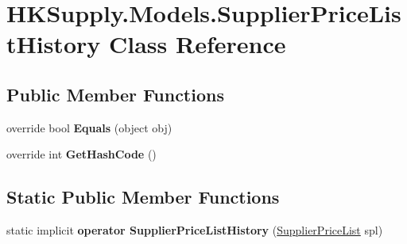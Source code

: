 \hypertarget{class_h_k_supply_1_1_models_1_1_supplier_price_list_history}{}\section{H\+K\+Supply.\+Models.\+Supplier\+Price\+List\+History Class Reference}
\label{class_h_k_supply_1_1_models_1_1_supplier_price_list_history}
\subsection*{Public Member Functions}
\begin{DoxyCompactItemize}
\item 
\mbox{\label{class_h_k_supply_1_1_models_1_1_supplier_price_list_history_ac92906c26dbc84673e3392821f1f87d0}} 
override bool {\bfseries Equals} (object obj)
\item 
\mbox{\label{class_h_k_supply_1_1_models_1_1_supplier_price_list_history_aab41e6bca3f34041ab970b25a9ece358}} 
override int {\bfseries Get\+Hash\+Code} ()
\end{DoxyCompactItemize}
\subsection*{Static Public Member Functions}
\begin{DoxyCompactItemize}
\item 
\mbox{\label{class_h_k_supply_1_1_models_1_1_supplier_price_list_history_a4f9d8a121a77818c187b7837fdba7dd9}} 
static implicit {\bfseries operator Supplier\+Price\+List\+History} (\mbox{\hyperlink{class_h_k_supply_1_1_models_1_1_supplier_price_list}{Supplier\+Price\+List}} spl)
\end{DoxyCompactItemize}
